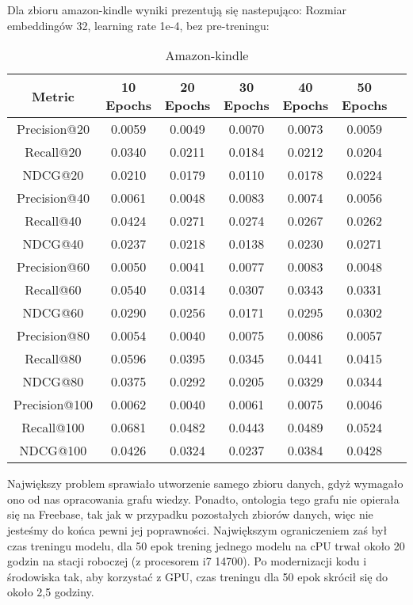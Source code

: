 \documentclass[a4paper,onecolumn]{LTJournalArticle}
\begin{document}
	Dla zbioru amazon-kindle wyniki prezentują się nastepująco:
	Rozmiar embeddingów 32, learning rate 1e-4, bez pre-treningu:
	\begin{table}[h]
		\centering
		\caption{Amazon-kindle}
		\label{tab:random_metrics}
		\scriptsize %
		\begin{tabular}{ccccccc}
			\toprule
			Metric & 10 Epochs & 20 Epochs & 30 Epochs & 40 Epochs & 50 Epochs \\
			\midrule
			Precision@20  & 0.0059  & 0.0049  & 0.0070  & 0.0073  & 0.0059  \\
			Recall@20     & 0.0340  & 0.0211  & 0.0184  & 0.0212  & 0.0204  \\
			NDCG@20       & 0.0210  & 0.0179  & 0.0110  & 0.0178  & 0.0224  \\
			Precision@40  & 0.0061  & 0.0048  & 0.0083  & 0.0074  & 0.0056  \\
			Recall@40     & 0.0424  & 0.0271  & 0.0274  & 0.0267  & 0.0262  \\
			NDCG@40       & 0.0237  & 0.0218  & 0.0138  & 0.0230  & 0.0271  \\
			Precision@60  & 0.0050  & 0.0041  & 0.0077  & 0.0083  & 0.0048  \\
			Recall@60     & 0.0540  & 0.0314  & 0.0307  & 0.0343  & 0.0331  \\
			NDCG@60       & 0.0290  & 0.0256  & 0.0171  & 0.0295  & 0.0302  \\
			Precision@80  & 0.0054  & 0.0040  & 0.0075  & 0.0086  & 0.0057  \\
			Recall@80     & 0.0596  & 0.0395  & 0.0345  & 0.0441  & 0.0415  \\
			NDCG@80       & 0.0375  & 0.0292  & 0.0205  & 0.0329  & 0.0344  \\
			Precision@100 & 0.0062  & 0.0040  & 0.0061  & 0.0075  & 0.0046  \\
			Recall@100    & 0.0681  & 0.0482  & 0.0443  & 0.0489  & 0.0524  \\
			NDCG@100      & 0.0426  & 0.0324  & 0.0237  & 0.0384  & 0.0428  \\
			\bottomrule
		\end{tabular}
	\end{table}

	Największy problem sprawiało utworzenie samego zbioru danych, gdyż wymagało ono od nas opracowania grafu wiedzy. Ponadto, ontologia tego grafu nie opierała się na Freebase, tak jak w przypadku pozostałych zbiorów danych, więc nie jesteśmy do końca pewni jej poprawności. Największym ograniczeniem zaś był czas treningu modelu, dla 50 epok trening jednego modelu na cPU trwał około 20 godzin na stacji roboczej (z procesorem i7 14700). Po modernizacji kodu i środowiska tak, aby korzystać z GPU, czas treningu dla 50 epok skrócił się do około 2,5 godziny. 
\end{document}
